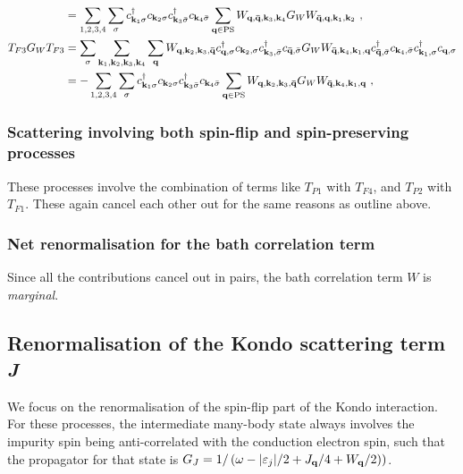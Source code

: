 \documentclass[reprint,hidelinks]{revtex4-2}
\begin{document}
\begin{widetext}
\begin{equation}
\begin{aligned}
							  &= \sum_{1,2,3,4}\sum_\sigma c^\dagger_{{\bf k}_1\sigma} c_{{\bf k}_2\sigma} c^\dagger_{{\bf k}_3\bar\sigma} c_{{\bf k}_4\bar \sigma} \sum_{\bf q \in \text{PS}} W_{{\bf q},{\bf \bar q},{\bf k}_3,{\bf k}_4} G_W W_{{\bf \bar q},{\bf q},{\bf k}_1,{\bf k}_2}~,\\
	T_{F3} G_W T_{F3} &= \sum_\sigma\sum_{{\bf k}_1, {\bf k}_2, {\bf k}_3, {\bf k}_4} \sum_{\bf q} W_{{\bf q},{\bf k}_2,{\bf k}_3,{\bf \bar q}} c^\dagger_{{\bf q},\sigma}c_{{\bf k}_2,\sigma}c^\dagger_{{\bf k}_3,\bar\sigma}c_{{\bf \bar q},\bar\sigma} G_W W_{{\bf \bar q},{\bf k}_4,{\bf k}_1,{\bf q}} c^\dagger_{{\bf \bar q},\bar\sigma} c_{{\bf k}_4,\bar\sigma} c^\dagger_{{\bf k}_1,\sigma} c_{{\bf q},\sigma} \\
							  &= -\sum_{1,2,3,4}\sum_\sigma c^\dagger_{{\bf k}_1\sigma} c_{{\bf k}_2\sigma} c^\dagger_{{\bf k}_3\bar\sigma} c_{{\bf k}_4\bar \sigma} \sum_{\bf q \in \text{PS}} W_{{\bf q},{\bf k}_2,{\bf k}_3,{\bf \bar q}} G_W W_{{\bf \bar q},{\bf k}_4,{\bf k}_1,{\bf q}}~,
\end{aligned}\end{equation}

\subsubsection*{Scattering involving both spin-flip and spin-preserving processes}
These processes involve the combination of terms like \(T_{P1}\) with \(T_{F4}\), and \(T_{P2}\) with \(T_{F1}\). These again cancel each other out for the same reasons as outline above.

\subsubsection*{Net renormalisation for the bath correlation term}
Since all the contributions cancel out in pairs, the bath correlation term \(W\) is {\it marginal}.

\subsection{Renormalisation of the Kondo scattering term {\it J}}
We focus on the renormalisation of the spin-flip part of the Kondo interaction. For these processes, the intermediate many-body state always involves the impurity spin being anti-correlated with the conduction electron spin, such that the propagator for that state is \(G_J = 1/\left(\omega - |\varepsilon_j|/2 + J_{\bf q}/4 + W_{\bf q}/2)\right) \).

\end{widetext}
\end{document}
